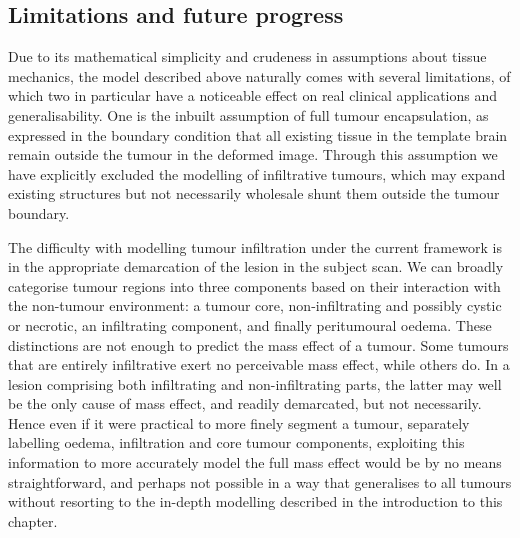 \subsection{Limitations and future progress}

Due to its mathematical simplicity and crudeness in assumptions about tissue mechanics, the model described above naturally comes with several limitations, of which two in particular have a noticeable effect on real clinical applications and generalisability.
One is the inbuilt assumption of full tumour encapsulation, as expressed in the boundary condition that all existing tissue in the template brain remain outside the tumour in the deformed image.
Through this assumption we have explicitly excluded the modelling of infiltrative tumours, which may expand existing structures but not necessarily wholesale shunt them outside the tumour boundary.

The difficulty with modelling tumour infiltration under the current framework is in the appropriate demarcation of the lesion in the subject scan.
We can broadly categorise tumour regions into three components based on their interaction with the non-tumour environment: a tumour core, non-infiltrating and possibly cystic or necrotic, an infiltrating component, and finally peritumoural oedema.
These distinctions are not enough to predict the mass effect of a tumour.
Some tumours that are entirely infiltrative exert no perceivable mass effect, while others do.
In a lesion comprising both infiltrating and non-infiltrating parts, the latter may well be the only cause of mass effect, and readily demarcated, but not necessarily.
Hence even if it were practical to more finely segment a tumour, separately labelling oedema, infiltration and core tumour components, exploiting this information to more accurately model the full mass effect would be by no means straightforward, and perhaps not possible in a way that generalises to all tumours without resorting to the in-depth modelling described in the introduction to this chapter.

